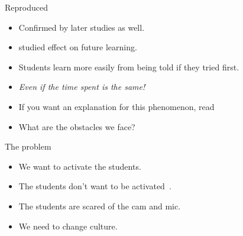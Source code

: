 \begin{frame}
  \begin{block}{Reproduced}
    \begin{itemize}
      \item Confirmed by later studies as well.
      \item \Textcite{BransfordSchwartz1999} studied effect on future learning.
      \item Students learn more easily from being told if they tried first.
    \end{itemize}
  \end{block}

  \pause

  \begin{remark}
    \begin{itemize}
      \item \emph{Even if the time spent is the same!}
    \end{itemize}
  \end{remark}
\end{frame}

\begin{frame}
  \begin{remark}
    \begin{itemize}
      \item If you want an explanation for this phenomenon, read
    \end{itemize}
    \begin{quote}
    \end{quote}
  \end{remark}
\end{frame}

\begin{frame}
  \begin{question}
    \begin{itemize}
      \item What are the obstacles we face?
    \end{itemize}
  \end{question}
\end{frame}

\begin{frame}
  \begin{block}{The problem}
    \begin{itemize}
      \item<1> We want to activate the students.
      \item<1> The students don't want to be 
        activated~\cite{ActualVSFeelingOfLearning}.
      \item<2> The students are scared of the cam and mic.
      \item<2> We need to change culture.
    \end{itemize}
  \end{block}
\end{frame}



